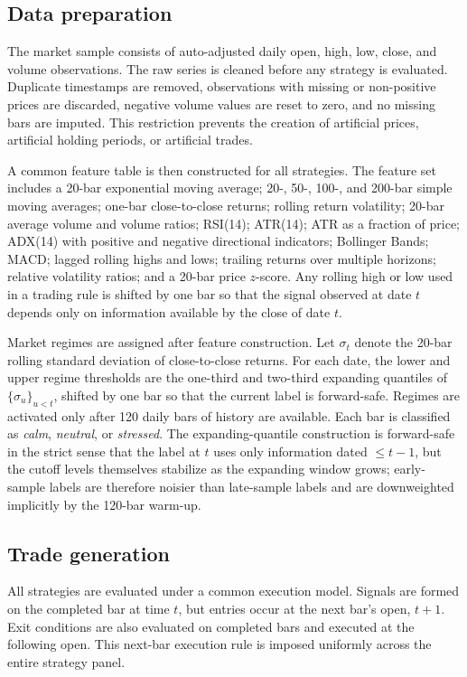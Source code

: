 \documentclass[preprint,12pt]{elsarticle}
\theoremstyle{definition}
\begin{document}
\subsection{Data preparation}

The market sample consists of auto-adjusted daily open, high, low, close, and volume observations. The raw series is cleaned before any strategy is evaluated. Duplicate timestamps are removed, observations with missing or non-positive prices are discarded, negative volume values are reset to zero, and no missing bars are imputed. This restriction prevents the creation of artificial prices, artificial holding periods, or artificial trades.

A common feature table is then constructed for all strategies. The feature set includes a 20-bar exponential moving average; 20-, 50-, 100-, and 200-bar simple moving averages; one-bar close-to-close returns; rolling return volatility; 20-bar average volume and volume ratios; RSI(14); ATR(14); ATR as a fraction of price; ADX(14) with positive and negative directional indicators; Bollinger Bands; MACD; lagged rolling highs and lows; trailing returns over multiple horizons; relative volatility ratios; and a 20-bar price $z$-score. Any rolling high or low used in a trading rule is shifted by one bar so that the signal observed at date $t$ depends only on information available by the close of date $t$.

Market regimes are assigned after feature construction. Let \(\sigma_t\) denote the 20-bar rolling standard deviation of close-to-close returns. For each date, the lower and upper regime thresholds are the one-third and two-third expanding quantiles of \(\{\sigma_u\}_{u<t}\), shifted by one bar so that the current label is forward-safe. Regimes are activated only after 120 daily bars of history are available. Each bar is classified as \emph{calm}, \emph{neutral}, or \emph{stressed}. The expanding-quantile construction is forward-safe in the strict sense that the label at $t$ uses only information dated $\le t-1$, but the cutoff levels themselves stabilize as the expanding window grows; early-sample labels are therefore noisier than late-sample labels and are downweighted implicitly by the 120-bar warm-up.

\subsection{Trade generation}

All strategies are evaluated under a common execution model. Signals are formed on the completed bar at time \(t\), but entries occur at the next bar's open, \(t+1\). Exit conditions are also evaluated on completed bars and executed at the following open. This next-bar execution rule is imposed uniformly across the entire strategy panel.
\end{document}
